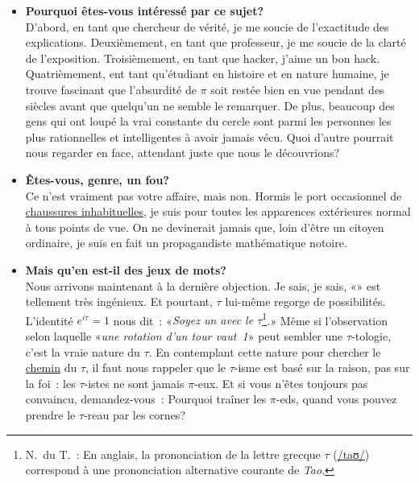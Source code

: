 \begin{itemize}
  \item \textbf{Pourquoi êtes-vous intéressé par ce sujet\ns?} \\ D'abord, en
  tant que chercheur de vérité, je me soucie de l'exactitude des explications.
  Deuxièmement, en tant que professeur, je me soucie de la clarté de
  l'exposition. Troisièmement, en tant que hacker, j'aime un bon hack.
  Quatrièmement, ent tant qu'étudiant en histoire et en nature humaine, je
  trouve fascinant que l'absurdité de $\pi$ soit restée bien en vue pendant des
  siècles avant que quelqu'un ne semble le remarquer. De plus, beaucoup des gens
  qui ont loupé la vrai constante du cercle sont parmi les personnes les plus
  rationnelles et intelligentes à avoir jamais vécu. Quoi d'autre pourrait nous
  regarder en face, attendant juste que nous le découvrions\ns?

  \item \textbf{Êtes-vous, genre, un fou\ns?} \\ Ce n'est vraiment pas votre
  affaire, mais non. Hormis le port occasionnel de
  \href{https://fr.wikipedia.org/wiki/Chaussure_à_orteils}{chaussures
  inhabituelles}, je suis pour toutes les apparences extérieures normal à tous
  points de vue. On ne devinerait jamais que, loin d'être un citoyen ordinaire,
  je suis en fait un propagandiste mathématique notoire.

  \item \textbf{Mais qu'en est-il des jeux de mots\ns?} \\ Nous arrivons
  maintenant à la dernière objection. Je sais, je sais,
  «\ns » est
  tellement très ingénieux. Et pourtant, $\tau$ lui-même regorge de
  possibilités. L'identité $e^{i\tau} = 1$ nous
  dit~: «\ns \emph{Soyez un avec le $\tau$}\ns\footnote{N.\ du T.~: En anglais,
  la prononciation de la lettre grecque $\tau$
  (\href{https://fr.wikipedia.org/wiki/Alphabet_phonétique_international}{/taʊ/})
  correspond à une prononciation alternative courante de
  \emph{Tao}.}\emph{.}\ns » Même si l'observation selon
  laquelle «\ns \emph{une rotation d'un tour vaut~1}\ns » peut sembler une
  $\tau$-tologie, c'est la vraie nature du $\tau$. En contemplant cette nature
  pour chercher le \href{https://fr.wikipedia.org/wiki/Tao_(culture)}{chemin} du
  $\tau$, il faut nous rappeler que le $\tau$-isme est basé sur la raison, pas
  sur la foi~: les $\tau$-istes ne sont jamais $\pi$-eux. Et si vous n'êtes
  toujours pas convaincu, demandez-vous~: Pourquoi traîner les $\pi$-eds, quand
  vous pouvez prendre le $\tau$-reau par les cornes\ns ?

\end{itemize}

